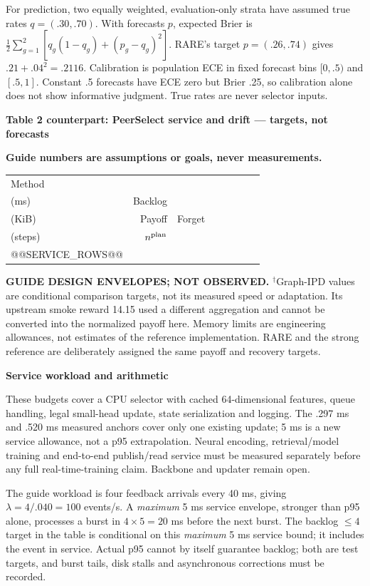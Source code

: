 \documentclass[10pt,a4paper]{article}
\newcommand{\metric}[1]{\makecell[c]{#1}}
\newcommand{\status}{\textcolor{red!70!black}{\textbf{Guide numbers are assumptions or goals, never measurements.}}\par}
\newcommand{\lead}[1]{\vspace{4pt}\textbf{#1}\par}
\begin{document}
For prediction, two equally weighted, evaluation-only strata have assumed true
rates $q=(.30,.70)$. With forecasts $p$, expected Brier is
$\frac12\sum_{g=1}^2[q_g(1-q_g)+(p_g-q_g)^2]$.
RARE's target $p=(.26,.74)$ gives $.21+.04^2=.2116$.
Calibration is population ECE in fixed forecast bins $[0,.5)$ and $[.5,1]$.
Constant .5 forecasts have ECE zero but Brier .25, so calibration alone does
not show informative judgment. True rates are never selector inputs.

\clearpage
\lead{Table 2 counterpart: PeerSelect service and drift --- targets, not forecasts}
\status
\begin{center}\small
\begin{tabular*}{\linewidth}{@{\extracolsep{\fill}}lrrrrrrr@{}}\toprule
Method & \metric{Update p95\\(ms)} & Backlog & \metric{State\\(KiB)} & Payoff & Forget & \metric{Recovery\\(steps)} & $n^{\rm plan}$\\\midrule
@@SERVICE_ROWS@@
\bottomrule\end{tabular*}\end{center}
\textbf{GUIDE DESIGN ENVELOPES; NOT OBSERVED.} $^{\dagger}$Graph-IPD values are
conditional comparison targets, not its measured speed or adaptation. Its
upstream smoke reward 14.15 used a different aggregation and cannot be converted
into the normalized payoff here. Memory limits are engineering allowances,
not estimates of the reference implementation. RARE and the strong reference
are deliberately assigned the same payoff and recovery targets.

\lead{Service workload and arithmetic}
These budgets cover a CPU selector with cached 64-dimensional features, queue
handling, legal small-head update, state serialization and logging. The .297 ms
and .520 ms measured anchors cover only one existing update; 5 ms is a new
service allowance, not a p95 extrapolation. Neural encoding, retrieval/model
training and end-to-end publish/read service must be measured separately before
any full real-time-training claim. Backbone and updater remain open.

The guide workload is four feedback arrivals every 40 ms, giving
$\lambda=4/.040=100$ events/s. A \emph{maximum} 5 ms service envelope, stronger
than p95 alone, processes a burst in $4\times5=20$ ms before the next burst.
The backlog $\leq4$ target in the table is conditional on this \emph{maximum}
5 ms service bound; it includes the event in service. Actual p95 cannot by
itself guarantee backlog; both are test targets,
and burst tails, disk stalls and asynchronous corrections must be recorded.
\end{document}
